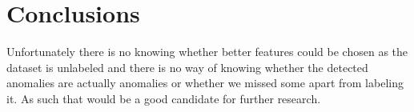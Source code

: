 \chapter{Conclusions}\label{ch:conclusions}



Unfortunately there is no knowing whether better features could be chosen as the dataset is unlabeled and there is no way of knowing whether the detected anomalies are actually anomalies or whether we missed some apart from labeling it. As such that would be a good candidate for further research.
